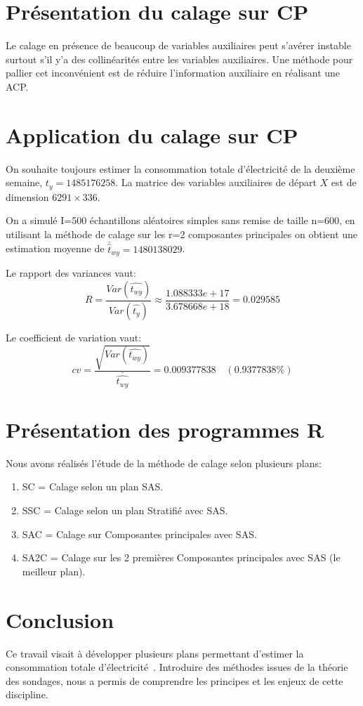 \section{Présentation du calage sur CP}

Le calage en présence de beaucoup de variables auxiliaires peut s'avérer instable surtout s'il y'a des collinéarités entre les variables auxiliaires. Une méthode pour pallier cet inconvénient est de réduire l'information auxiliaire en réalisant une ACP.

\section{Application du calage sur CP}

On souhaite toujours estimer la consommation totale d'électricité de la deuxième semaine, $t_y=1485176258$. La matrice des variables auxiliaires de départ $X$ est de dimension $6291 \times 336$.

On a simulé I=500 échantillons aléatoires simples sans remise de taille n=600, en utilisant la méthode de calage sur les r=2 composantes principales on obtient une estimation moyenne de $\bar{\hat{t}}_{wy}=1480138029$.

Le rapport des variances vaut:
\begin{equation*}
R=\frac{Var(\hat{t_{wy}})}{Var(\hat{t_y})}\approx\frac{1.088333e+17}{3.678668e+18}=0.029585
\end{equation*}

Le coefficient de variation vaut:
\begin{equation*}
cv=\frac{\sqrt{Var(\hat{t_{wy}})}}{\bar{\hat{t_{wy}}}} = 0.009377838 \quad (0.9377838\%)
\end{equation*}

\section{Présentation des programmes R}

Nous avons réalisés l'étude de la méthode de calage selon plusieurs plans:
\begin{enumerate}
\item[-] SC = Calage selon un plan SAS.
\item[-] SSC = Calage selon un plan Stratifié avec SAS.
\item[-] SAC = Calage sur Composantes principales avec SAS.
\item[-] SA2C = Calage sur les 2 premières Composantes principales avec SAS (le meilleur plan).
\end{enumerate}

\section{Conclusion}

Ce travail visait à développer plusieurs plans permettant d’estimer la consommation totale d'électricité~\cite{abdulhadiDevelopingScalingLaws2023}. Introduire des méthodes issues de la théorie des sondages, nous a permis de comprendre les principes et les enjeux de cette discipline.
